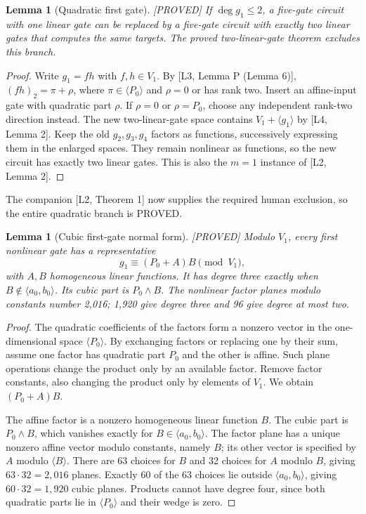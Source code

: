\documentclass[11pt,a4paper]{article}
\newtheorem{lemma}[theorem]{Lemma}
\newcommand{\status}[1]{\hfill\textsf{[#1]}}
\begin{document}
\begin{lemma}[Quadratic first gate]\label{lem:reduce}\status{PROVED}
If $\deg g_1\le2$, a five-gate circuit with one linear gate can be replaced by a five-gate circuit with exactly two linear gates that computes the same targets. The proved two-linear-gate theorem excludes this branch.
\end{lemma}
\begin{proof}
Write $g_1=fh$ with $f,h\in V_1$. By [L3, Lemma P (Lemma 6)], $(fh)_2=\pi+\rho$, where $\pi\in\langle P_0\rangle$ and $\rho=0$ or has rank two. Insert an affine-input gate with quadratic part $\rho$. If $\rho=0$ or $\rho=P_0$, choose any independent rank-two direction instead. The new two-linear-gate space contains $V_1+\langle g_1\rangle$ by [L4, Lemma 2]. Keep the old $g_2,g_3,g_4$ factors as functions, successively expressing them in the enlarged spaces. They remain nonlinear as functions, so the new circuit has exactly two linear gates. This is also the $m=1$ instance of [L2, Lemma 2].
\end{proof}
The companion [L2, Theorem 1] now supplies the required human exclusion, so the entire quadratic branch is PROVED.

\begin{lemma}[Cubic first-gate normal form]\label{lem:cubic}\status{PROVED}
Modulo $V_1$, every first nonlinear gate has a representative
\[
g_1\equiv(P_0+A)B\pmod{V_1},
\]
with $A,B$ homogeneous linear functions. It has degree three exactly when $B\notin\langle a_0,b_0\rangle$. Its cubic part is $P_0\wedge B$. The nonlinear factor planes modulo constants number 2,016; 1,920 give degree three and 96 give degree at most two.
\end{lemma}
\begin{proof}
The quadratic coefficients of the factors form a nonzero vector in the one-dimensional space $\langle P_0\rangle$. By exchanging factors or replacing one by their sum, assume one factor has quadratic part $P_0$ and the other is affine. Such plane operations change the product only by an available factor. Remove factor constants, also changing the product only by elements of $V_1$. We obtain $(P_0+A)B$.

The affine factor is a nonzero homogeneous linear function $B$. The cubic part is $P_0\wedge B$, which vanishes exactly for $B\in\langle a_0,b_0\rangle$. The factor plane has a unique nonzero affine vector modulo constants, namely $B$; its other vector is specified by $A$ modulo $\langle B\rangle$. There are 63 choices for $B$ and 32 choices for $A$ modulo $B$, giving $63\cdot32=2,016$ planes. Exactly 60 of the 63 choices lie outside $\langle a_0,b_0\rangle$, giving $60\cdot32=1,920$ cubic planes. Products cannot have degree four, since both quadratic parts lie in $\langle P_0\rangle$ and their wedge is zero.
\end{proof}
\end{document}
